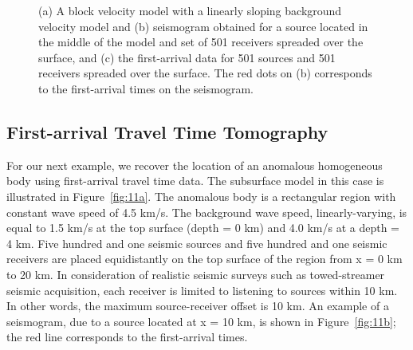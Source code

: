 \documentclass[manuscript,revised]{geophysics}
\begin{document}
{\begin{figure}
\caption{(a) A block velocity model with a linearly sloping background velocity model and (b) seismogram obtained for a source located in the middle of the model and set of 501 receivers spreaded over the surface, and (c) the first-arrival data for 501 sources and 501 receivers spreaded over the surface. The red dots on (b) corresponds to the first-arrival times on the seismogram.}
\label{fig:11}
\end{figure}
}

\subsection{First-arrival Travel Time Tomography}
For our next example, we recover the location of an anomalous homogeneous body using first-arrival travel time data.  The subsurface model in this case is illustrated in Figure~\ref{fig:11a}.  The anomalous body is a rectangular region with constant wave speed of 4.5 km/s.  The background wave speed, linearly-varying, is equal to 1.5 km/s at the top surface (depth = 0 km) and 4.0 km/s at a depth = 4 km.  Five hundred and one seismic sources and five hundred and one seismic receivers are placed equidistantly on the top surface of the region from x = 0 km to 20 km. In consideration of realistic seismic surveys such as towed-streamer seismic acquisition, each receiver is limited to listening to sources within 10 km.  In other words, the maximum source-receiver offset is 10 km.   An example of a seismogram, due to a source located at x = 10 km, is shown in Figure~\ref{fig:11b}; the red line corresponds to the first-arrival times.
\end{document}
